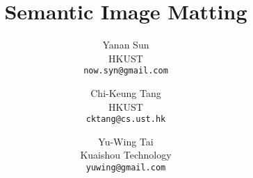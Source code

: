 \documentclass[10pt,twocolumn,letterpaper]{article}
\begin{document}
\title{Semantic Image Matting}

\author{Yanan Sun\\
HKUST\\
{\tt\small now.syn@gmail.com}


\and
Chi-Keung Tang\\
HKUST\\
{\tt\small cktang@cs.ust.hk}

\and
Yu-Wing Tai\\
Kuaishou Technology\\
{\tt\small yuwing@gmail.com}

}

\maketitle
\end{document}
